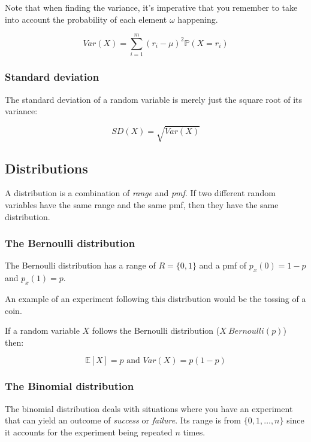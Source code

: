 Note that when finding the variance, it's imperative that you remember to take
into account the probability of each element $\omega$ happening.

\begin{dmath*}
	{Var(X) = \sum\limits_{i=1}^{m}(r_i - \mu)^2\mathbb{P}(X=r_i)}
\end{dmath*}

\subsubsection{Standard deviation}

The standard deviation of a random variable is merely just the square root of
its variance:

\begin{dmath*}
	SD(X) = \sqrt{Var(X)}
\end{dmath*}

\subsection{Distributions}

A distribution is a combination of {\it range} and {\it pmf}. If two different
random variables have the same range and the same pmf, then they have the same
distribution.

\subsubsection{The Bernoulli distribution}

The Bernoulli distribution has a range of $R = \{0, 1\}$ and a pmf of $p_x(0) =
1-p$ and $p_x(1) = p$.

An example of an experiment following this distribution would be the tossing of
a coin.

If a random variable $X$ follows the Bernoulli distribution ($X ~ Bernoulli(p)$)
then:

\begin{dmath*}
	{\mathbb{E}[X] = p} \textrm{ and } {Var(X) = p(1-p)}
\end{dmath*}

\subsubsection{The Binomial distribution}

The binomial distribution deals with situations where you have an experiment
that can yield an outcome of {\it success} or {\it failure}. Its range is from
$\{0, 1, \dots, n\}$ since it accounts for the experiment being repeated $n$
times.

